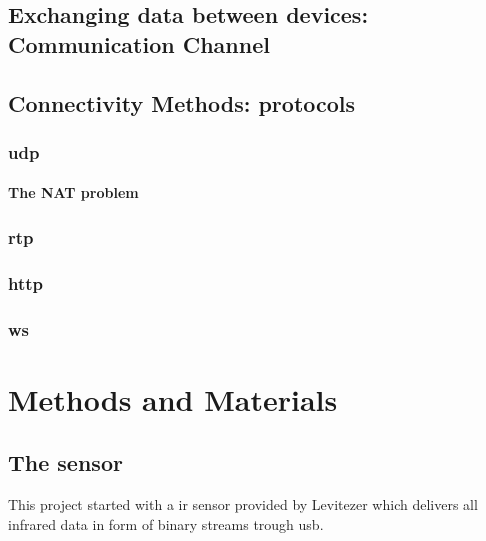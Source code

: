 \documentclass[hidelinks,11pt,a4paper,oneside,article]{memoir}
\begin{document}

\section{Exchanging data between devices: Communication Channel}
\section{Connectivity Methods: protocols}
\subsection{\gls{udp}}
\subsubsection{The NAT problem}
\subsection{\gls{rtp}}
\subsection{\gls{http}}
\cite{http-rfc}
\subsection{\gls{ws}}
\cite[p.~30]{rfc6455}




\chapter{Methods and Materials}


\section{The sensor}
This project started with a \gls{ir} sensor provided by Levitezer which delivers all infrared data in form of binary streams trough \gls{usb}.
\end{document}

